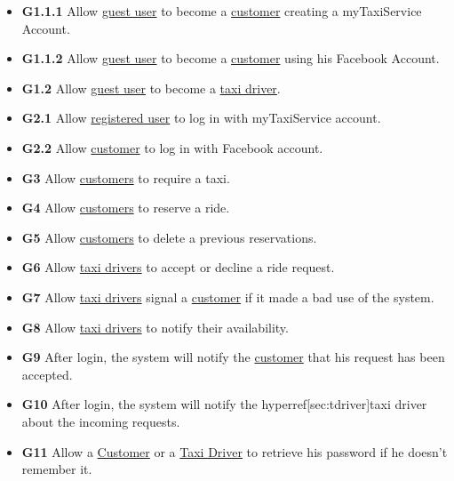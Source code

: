 \documentclass{report}
\begin{document}
		\begin{itemize}
			\item \textbf{\lbrack G1.1.1\rbrack}\label{sec:g1_1_1} Allow \hyperref[sec:normaluser]{guest user} to become a \hyperref[sec:customer]{customer} creating a myTaxiService Account.

			\item \textbf{\lbrack G1.1.2\rbrack}\label{sec:g1_1_2} Allow \hyperref[sec:normaluser]{guest user} to become a \hyperref[sec:customer]{customer} using his Facebook Account.

			\item \textbf{\lbrack G1.2\rbrack}\label{sec:g1_2} Allow \hyperref[sec:normaluser]{guest user} to become a \hyperref[sec:tdriver]{taxi driver}.

			\item \textbf{\lbrack G2.1\rbrack}\label{sec:g2_1}  Allow \hyperref[sec:ruser]{registered user} to log in with myTaxiService account.

			\item \textbf{\lbrack G2.2\rbrack}\label{sec:g2_2}  Allow \hyperref[sec:customer]{customer} to log in with Facebook account.

			\item \textbf{\lbrack G3\rbrack}\label{sec:g3}  Allow \hyperref[sec:customer]{customers} to require a taxi.

			\item \textbf{\lbrack G4\rbrack}\label{sec:g4}  Allow \hyperref[sec:customer]{customers} to reserve a ride.

			\item \textbf{\lbrack G5\rbrack}\label{sec:g5}  Allow \hyperref[sec:customer]{customers} to delete a previous reservations.

			\item \textbf{\lbrack G6\rbrack}\label{sec:g6}  Allow \hyperref[sec:tdriver]{taxi drivers} to accept or decline a ride request.

			\item \textbf{\lbrack G7\rbrack}\label{sec:g7} Allow \hyperref[sec:tdriver]{taxi drivers} signal a \hyperref[sec:customer]{customer} if it made a bad use of the system.

			\item \textbf{\lbrack G8\rbrack}\label{sec:g8}  Allow \hyperref[sec:tdriver]{taxi drivers} to notify their availability.

			\item \textbf{\lbrack G9\rbrack}\label{sec:g9}  After login, the system will notify the \hyperref[sec:customer]{customer} that his request has been accepted.

			\item \textbf{\lbrack G10\rbrack}\label{sec:g10}  After login, the system will notify the hyperref[sec:tdriver]{taxi driver} about the incoming requests.

			\item \textbf{\lbrack G11\rbrack}\label{sec:g11} Allow a \hyperref[sec:customer]{Customer} or a \hyperref[sec:tdriver]{Taxi Driver} to retrieve his password if he doesn't remember it.
		\end{itemize}
		
\end{document}
